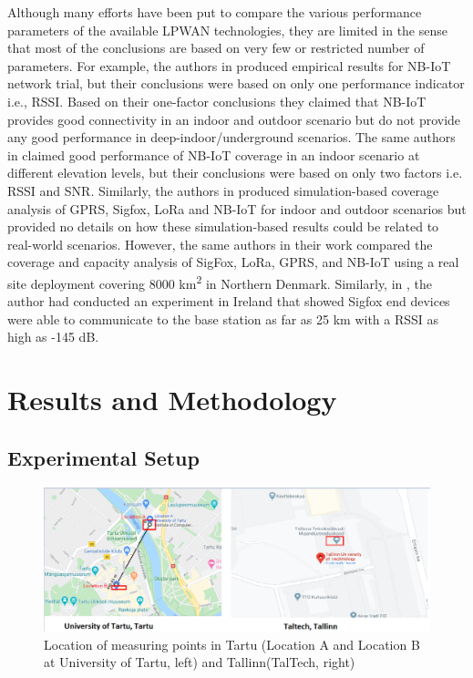 \documentclass[12pt]{article}
\begin{document}
Although many efforts have been put to compare the various performance parameters of the available LPWAN technologies, they are limited in the sense that most of the conclusions are based on very few or restricted number of parameters. For example, the authors in \cite{malik2019nb} produced empirical results for NB-IoT network trial, but their conclusions were based on only one performance indicator i.e., RSSI. Based on their one-factor conclusions they claimed that NB-IoT provides good connectivity in an indoor and outdoor scenario but do not provide any good performance in deep-indoor/underground scenarios. The same authors in \cite{khan2019dorm} claimed good performance of NB-IoT coverage in an indoor scenario at different elevation levels, but their conclusions were based on only two factors i.e. RSSI and SNR. Similarly, the authors in \cite{lauridsen2017coverage} produced simulation-based coverage analysis of GPRS, Sigfox, LoRa and NB-IoT for indoor and outdoor scenarios but provided no details on how these simulation-based results could be related to real-world scenarios. However, the same authors in their work \cite{vejlgaard2017coverage} compared the coverage and capacity analysis of SigFox, LoRa, GPRS, and NB-IoT  using a real site deployment covering 8000 km\textsuperscript{2} in Northern Denmark. Similarly, in \cite{nolan2016evaluation}, the author had conducted an experiment in Ireland that showed Sigfox end devices were able to communicate to the base station as far as 25 km with a RSSI as high as -145 dB.


\section{Results and Methodology}\label{Results and Methodology}

\subsection{Experimental Setup}
\begin{figure}[!h]
    \centering
    \includegraphics[width=0.9\columnwidth]{Images/locations.pdf}
    \caption{Location  of  measuring  points  in  Tartu  (Location A  and  Location  B  at  University  of  Tartu,  left)  and  Tallinn(TalTech, right)}
    \label{fig:Observation locations}
\end{figure}
\end{document}

